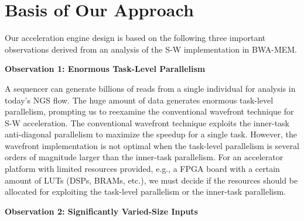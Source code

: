 \section{Basis of Our Approach}
\label{sec:approach}

Our acceleration engine design is based on the following three important observations 
derived from an analysis of the S-W implementation in BWA-MEM.

\vspace{1pt}
\textbf{Observation 1: Enormous Task-Level Parallelism}
\vspace{1pt}

A sequencer can generate billions of reads from a single individual for analysis in today's NGS flow.
The huge amount of data generates enormous task-level parallelism, prompting us to reexamine the conventional wavefront technique for S-W acceleration.
The conventional wavefront technique exploits the inner-task anti-diagonal parallelism to maximize the speedup for a single task.
However, the wavefront implementation is not optimal when the task-level parallelism is several orders of magnitude larger than the inner-task parallelism.
For an accelerator platform with limited resources provided, e.g., a FPGA board with a certain amount of LUTs (DSPs, BRAMs, etc.), we must decide if the resources should be allocated for exploiting the task-level parallelism or the inner-task parallelism.

\vspace{1pt}
\textbf{Observation 2: Significantly Varied-Size Inputs}
\vspace{1pt}

